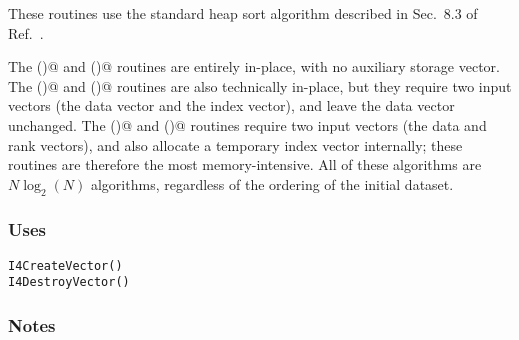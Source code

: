 These routines use the standard heap sort algorithm described in
Sec.~8.3 of Ref.~\cite{ptvf:1992}.

The \verb@SHeapSort()@ and \verb@DHeapSort()@ routines are entirely
in-place, with no auxiliary storage vector.  The \verb@SHeapIndex()@
and \verb@DHeapIndex()@ routines are also technically in-place, but
they require two input vectors (the data vector and the index vector),
and leave the data vector unchanged.  The \verb@SHeapRank()@ and
\verb@DHeapRank()@ routines require two input vectors (the data and
rank vectors), and also allocate a temporary index vector internally;
these routines are therefore the most memory-intensive.  All of these
algorithms are $N\log_2(N)$ algorithms, regardless of the ordering of
the initial dataset.


\subsubsection{Uses}
\begin{verbatim}
I4CreateVector()
I4DestroyVector()
\end{verbatim}

\subsubsection{Notes}

